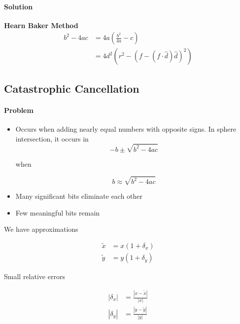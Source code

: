     \paragraph{Solution} \textbf{Hearn Baker Method}
    \begin{align}
      b^{2} - 4ac &= 4a \left( \frac{b^{2}}{4a} - c \right) \\
      &= 4d^{2} \left( r^{2} - \left( f - \left( f \cdot \hat{d} \right) \hat{d} \right)^{2} \right)
    \end{align}

  \subsection{Catastrophic Cancellation}

    \paragraph{Problem}
    \begin{itemize}
      \item Occurs when adding nearly equal numbers with opposite signs.
      In sphere intersection, it occurs in
      \begin{equation*}
        -b \pm \sqrt{b^{2} - 4ac}
      \end{equation*}

      when

      \begin{equation*}
        b \approx \sqrt{b^{2} - 4ac}
      \end{equation*}

      \item Many significant bits eliminate each other
      \item Few meaningful bits remain
    \end{itemize}

    We have approximations

    \begin{align}
      \tilde{x} &= x \left( 1 + \delta_{x} \right) \\
      \tilde{y} &= y \left( 1 + \delta_{y} \right)
    \end{align}

    Small relative errors

    \begin{align}
      \left| \delta_{x} \right| &= \frac{\left| x - \tilde{x} \right|}{\left| x \right|} \\
      \left| \delta_{y} \right| &= \frac{\left| y - \tilde{y} \right|}{\left| y \right|}
    \end{align}

